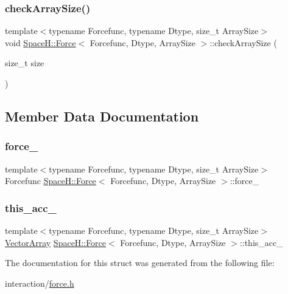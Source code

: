 \subsubsection{\texorpdfstring{check\+Array\+Size()}{checkArraySize()}}
{\footnotesize\ttfamily template$<$typename Forcefunc, typename Dtype, size\+\_\+t Array\+Size$>$ \\
void \mbox{\hyperlink{struct_space_h_1_1_force}{Space\+H\+::\+Force}}$<$ Forcefunc, Dtype, Array\+Size $>$\+::check\+Array\+Size (\begin{DoxyParamCaption}\item[{size\+\_\+t}]{size }\end{DoxyParamCaption})\hspace{0.3cm}{\ttfamily [inline]}}



\subsection{Member Data Documentation}
\mbox{\label{struct_space_h_1_1_force_a9d669e983d78f8bfa0e1a08dd27b6abb}} 
\subsubsection{\texorpdfstring{force\+\_\+}{force\_}}
{\footnotesize\ttfamily template$<$typename Forcefunc, typename Dtype, size\+\_\+t Array\+Size$>$ \\
Forcefunc \mbox{\hyperlink{struct_space_h_1_1_force}{Space\+H\+::\+Force}}$<$ Forcefunc, Dtype, Array\+Size $>$\+::force\+\_\+\hspace{0.3cm}{\ttfamily [protected]}}

\mbox{\label{struct_space_h_1_1_force_a7e87abc40a345bc5e24bdf56ca32f045}} 
\subsubsection{\texorpdfstring{this\+\_\+acc\+\_\+}{this\_acc\_}}
{\footnotesize\ttfamily template$<$typename Forcefunc, typename Dtype, size\+\_\+t Array\+Size$>$ \\
\mbox{\hyperlink{struct_space_h_1_1_force_aa58fd21903006c1d033713d04b4719f3}{Vector\+Array}} \mbox{\hyperlink{struct_space_h_1_1_force}{Space\+H\+::\+Force}}$<$ Forcefunc, Dtype, Array\+Size $>$\+::this\+\_\+acc\+\_\+\hspace{0.3cm}{\ttfamily [protected]}}



The documentation for this struct was generated from the following file\+:\begin{DoxyCompactItemize}
\item 
interaction/\mbox{\hyperlink{force_8h}{force.\+h}}\end{DoxyCompactItemize}
